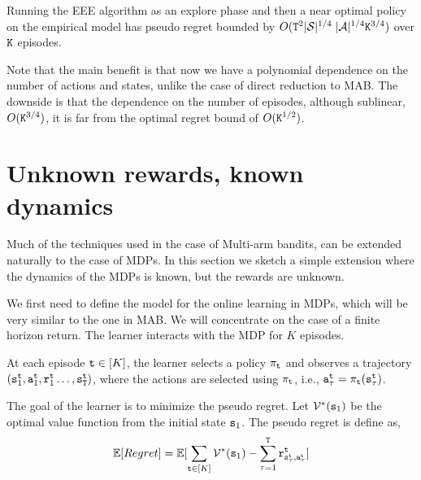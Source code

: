 \begin{theorem}
Running the EEE algorithm as an explore phase and then a near optimal policy on the empirical model has pseudo regret bounded by $O( {\tt T}^2 |\mathcal{S}|^{1/4}\;|\mathcal{A}|^{1/4}{\tt K}^{3/4})$ over ${\tt K}$ episodes.
\end{theorem}

Note that the main benefit is that now we have a polynomial dependence on the number of actions and states, unlike the case of direct reduction to MAB. The downside is that the dependence on the number of episodes, although sublinear, $O({\tt K}^{3/4})$, it is far from the optimal regret bound of $O({\tt K}^{1/2})$.



\section{Unknown rewards, known dynamics}

Much of the techniques used in the case of Multi-arm bandits, can be extended naturally to the case of MDPs. In this section we sketch a simple extension where the dynamics of the MDPs is known, but the rewards are unknown. 

We first need to define the model for the online learning in MDPs, which will be very similar to the one in MAB. We will concentrate on the case of a finite horizon return. The learner interacts with the MDP for $K$ episodes.

At each episode ${\tt t}\in[K]$, the learner selects a policy $\pi_{\tt t}$ and observes a trajectory $({\tt s}^{\tt t}_1, {\tt a}^{\tt t}_1,{\tt r}^{\tt t}_1 \ldots , {\tt s}_{\tt T}^{\tt t})$, where the actions are selected using $\pi_{\tt t}$, i.e., ${\tt a}_\tau^{\tt t}=\pi_{\tt t}({\tt s}_\tau^{\tt t})$.

The goal of the learner is to minimize the pseudo regret. Let $\mathcal{V}^*({\tt s}_1)$ be the optimal value function from the initial state ${\tt s}_1$. The pseudo regret is define as,
\[
\mathbb{E}[Regret] = \mathbb{E}[\sum_{{\tt t}\in[K]}\mathcal{V}^*({\tt s}_1)-\sum_{\tau=1}^{\tt T} {\tt r}^{\tt t}_{{\tt s}_\tau^{\tt t},{\tt a}_\tau^{\tt t}}]
\]

